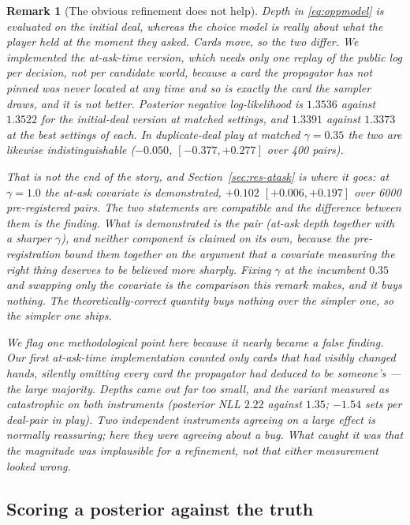 \documentclass[11pt,letterpaper]{article}
\newtheorem{remark}{Remark}
\begin{document}
\begin{remark}[The obvious refinement does not help]
Depth in \eqref{eq:oppmodel} is evaluated on the initial deal, whereas the
choice model is really about what the player held \emph{at the moment they
asked}. Cards move, so the two differ. We implemented the at-ask-time version,
which needs only one replay of the public log per decision, not per
candidate world, because a card the propagator has not pinned was never located
at any time and so is exactly the card the sampler draws, and it is not
better. Posterior negative log-likelihood is $1.3536$ against $1.3522$ for the
initial-deal version at matched settings, and $1.3391$ against $1.3373$ at the
best settings of each. In duplicate-deal play at matched $\gamma = 0.35$ the two
are likewise indistinguishable ($-0.050$, $[-0.377, +0.277]$ over 400 pairs).

That is not the end of the story, and Section~\ref{sec:res-atask} is where it
goes: at $\gamma = 1.0$ the at-ask covariate \emph{is} demonstrated, $+0.102$
$[+0.006, +0.197]$ over 6000 pre-registered pairs. The two statements are
compatible and the difference between them is the finding. What is demonstrated
is the \emph{pair} (at-ask depth together with a sharper $\gamma$), and
neither component is claimed on its own, because the pre-registration bound them
together on the argument that a covariate measuring the right thing deserves to
be believed more sharply. Fixing $\gamma$ at the incumbent $0.35$ and swapping
only the covariate is the comparison this remark makes, and it buys nothing.
The theoretically-correct quantity buys nothing over the
simpler one, so the simpler one ships.

We flag one methodological point here because it nearly became a false finding.
Our first at-ask-time implementation counted only cards that had \emph{visibly}
changed hands, silently omitting every card the propagator had \emph{deduced} to
be someone's --- the large majority. Depths came out far too small, and the
variant measured as catastrophic on both instruments (posterior NLL $2.22$
against $1.35$; $-1.54$ sets per deal-pair in play). Two independent instruments
agreeing on a large effect is normally reassuring; here they were agreeing about
a bug. What caught it was that the magnitude was implausible for a refinement,
not that either measurement looked wrong.
\end{remark}

\subsection{Scoring a posterior against the truth}
\label{sec:posterior-quality}
\end{document}
